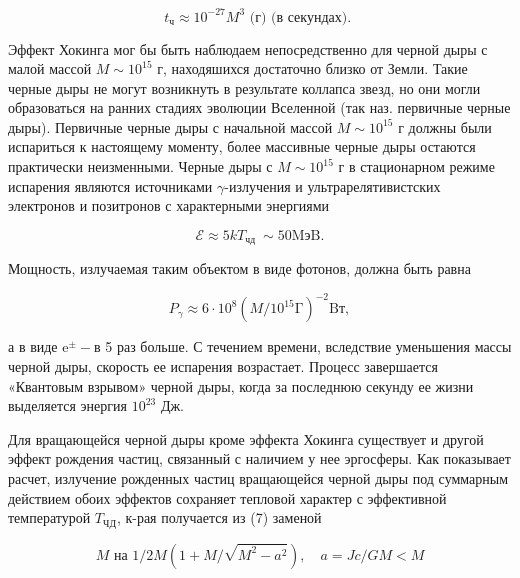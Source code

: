 \documentclass[10pt]{article}
\begin{document}
\[

t_{ч} \approx 10^{-27} M^{3} \text { (г) (в секундах). }

\]



Эффект Хокинга мог бы быть наблюдаем непосредственно для черной дыры с малой массой $M \sim 10^{15}$ г, находяшихся достаточно близко от Земли. Такие черные дыры не могут возникнуть в результате коллапса звезд, но они могли образоваться на ранних стадиях эволюции Вселенной (так наз. первичные черные дыры). Первичные черные дыры с начальной массой $M \sim 10^{15}$ г должны были испариться к настоящему моменту, более массивные черные дыры остаются практически неизменными. Черные дыры с $M \sim 10^{15}$ г в стационарном режиме испарения являются источниками $\gamma$-излучения и ультрарелятивистских электронов и позитронов с характерными энергиями



\[

\mathscr{E} \approx 5 k T_{\text {чд }} \sim 50 \mathrm{MэB.}

\]



Мощность, излучаемая таким объектом в виде фотонов, должна быть равна



\[

P_{\gamma} \approx 6 \cdot 10^{8}\left(M / 10^{15} \mathrm{\Gamma}\right)^{-2} \mathrm{Bт},

\]



а в виде $\mathrm{e}^{ \pm}-$в 5 раз больше. С течением времени, вследствие уменьшения массы черной дыры, скорость ее испарения возрастает. Процесс завершается «Квантовым взрывом» черной дыры, когда за последнюю секунду ее жизни выделяется энергия $10^{23}$ Дж.



Для вращающейся черной дыры кроме эффекта Хокинга существует и другой эффект рождения частиц, связанный с наличием у нее эргосферы. Как показывает расчет, излучение рожденных частиц вращающейся черной дыры под суммарным действием обоих эффектов сохраняет тепловой характер с эффективной температурой $T_{Ч Д}$, к-рая получается из (7) заменой



\[

M \text { на } 1 / 2 M\left(1+M / \sqrt{M^{2}-a^{2}}\right), \quad a=J c / G M<M

\]
\end{document}
